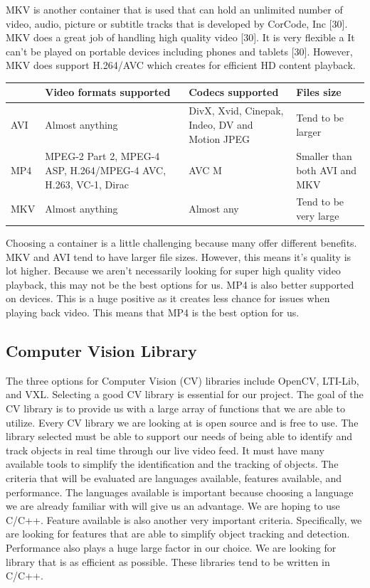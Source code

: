 \documentclass[onecolumn, draftclsnofoot,10pt, compsoc]{IEEEtran}
\begin{document}
MKV is another container that is used that can hold an unlimited number of video, audio, picture or subtitle tracks  that is developed by CorCode, Inc [30].
MKV does a great job of handling high quality video [30].
It is very flexible a
It can't be played on portable devices including phones and tablets [30].
However, MKV does support H.264/AVC which creates for efficient HD content playback.

\begin{center}
	\begin{tabular}{|p{2cm}|p{5cm}|p{4cm}|p{4cm}|}
		
		\hline
		\textbf{} & \textbf{Video formats supported} & \textbf{Codecs supported} & \textbf{Files size} \\
		\hline
		AVI & Almost anything & DivX, Xvid, Cinepak, Indeo, DV and Motion JPEG & Tend to be larger \\
		\hline
		MP4 & MPEG-2 Part 2, MPEG-4 ASP, H.264/MPEG-4 AVC, H.263, VC-1, Dirac & AVC M & Smaller than both AVI and MKV \\
		\hline
		MKV & Almost anything & Almost any & Tend to be very large \\
		\hline
		
	\end{tabular}
\end{center}

Choosing a container is a little challenging because many offer different benefits.
MKV and AVI tend to have larger file sizes.
However, this means it's quality is lot higher.
Because we aren't necessarily looking for super high quality video playback, this may not be the best options for us.
MP4 is also better supported on devices.
This is a huge positive as it creates less chance for issues when playing back video.
This means that MP4 is the best option for us.


\newpage
\subsection{Computer Vision Library} %
The three options for Computer Vision (CV) libraries include OpenCV, LTI-Lib, and VXL.
Selecting a good CV library is essential for our project.
The goal of the CV library is to provide us with a large array of functions that we are able to utilize.
Every CV library we are looking at is open source and is free to use.
The library selected must be able to support our needs of being able to identify and track objects in real time through our live video feed.
It must have many available tools to simplify the identification and the tracking of objects.
The criteria that will be evaluated are languages available, features available, and performance.
The languages available is important because choosing a language we are already familiar with will give us an advantage.
We are hoping to use C/C++.
Feature available is also another very important criteria.
Specifically, we are looking for features that are able to simplify object tracking and detection.
Performance also plays a huge large factor in our choice.
We are looking for library that is as efficient as possible.
These libraries tend to be written in C/C++.
\end{document}
